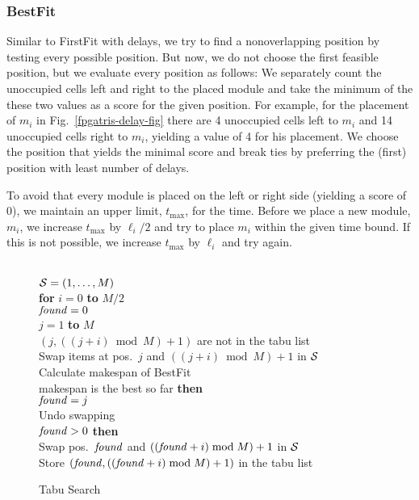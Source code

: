 \documentclass[10pt,journal]{IEEEtran}
\begin{document}
\subsubsection{BestFit} Similar to FirstFit with delays, we try to find a 
nonoverlapping position by testing every possible position. But now,
we do not choose the first feasible position, but we evaluate every
position as follows:
We separately count the unoccupied cells left and right to the placed module
and take the minimum of the these two values as a score for the given position.
For example, for the placement of $m_i$ in Fig.~\ref{fpgatris-delay-fig}
there are 4 unoccupied cells left to $m_i$ and 14 unoccupied cells
right to $m_i$, yielding a value of 4 for his placement.
We choose the position that yields the minimal score and break ties by
preferring the (first) position with least number of delays.

To avoid that every module is placed on the left or right side (yielding a
score of 0), we maintain an upper limit, $t_\mathrm{max}$, for the time.
Before we place a new module, $m_i$, we increase $t_\mathrm{max}$ by
$\ell_i/2$  and try to place $m_i$ within the given time bound. 
If this is not possible, we increase $t_\mathrm{max}$ by $\ell_i$ and
try again.

\begin{figure}[t]
\mbox{}\hrulefill\\
${\cal S} = (1,\ldots,M)$\\
{\bf for} $i = 0$ {\bf to} $M/2$\\
\mbox{}\quad ${\it found} = 0$\\
\mbox{} $j = 1$ {\bf to} $M$\\
\mbox{} $(j, ((j + i) \bmod M)+1)$ are not in the tabu list\\
\mbox{}\qquad\quad Swap items at pos.\ $j$
and $((j + i) \bmod M)+1$ in ${\cal S}$\\
\mbox{}\qquad\quad Calculate makespan of BestFit\\
\mbox{}\qquad{} makespan is the best so far {\bf then}\\ 
\mbox{}\qquad\qquad ${\it found} = j$\\
\mbox{}\qquad\quad Undo swapping\\
\mbox{} ${\it found} > 0$  {\bf then}\\
\mbox{}\qquad Swap pos.\ ${\it found}$ and $(({\it found} + i) \bmod M)+1$
in ${\cal S}$\\
\mbox{}\qquad Store $({\it found}, (({\it found} + i) \bmod M)+1)$ 
in the tabu list\\
\mbox{}\hrulefill
\caption{Tabu Search\label{fpgatris:tabusearch}}
\end{figure}
\end{document}
